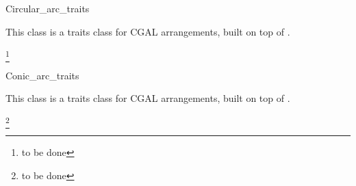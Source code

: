 \begin{ccRefClass}{Circular_arc_traits}

\ccDefinition

This class is a traits class for CGAL arrangements, built on top of 
. 

\ccIsModel
\footnote{to be done}

\end{ccRefClass}
\begin{ccRefClass}{Conic_arc_traits}

\ccDefinition

This class is a traits class for CGAL arrangements, built on top of 
. 

\ccIsModel
\footnote{to be done}

\end{ccRefClass}
